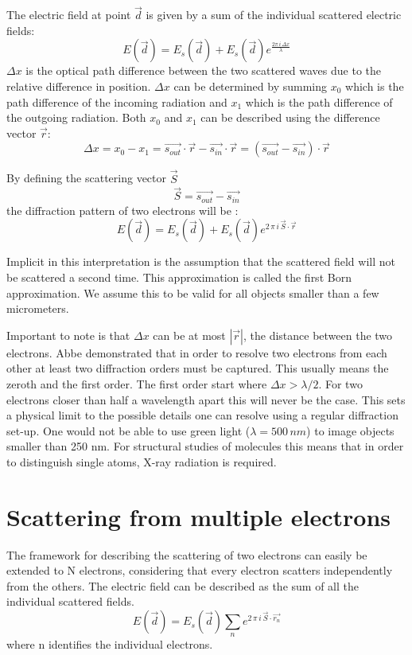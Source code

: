 The electric field at point $\vec{d}$ is given by a sum of the individual scattered electric fields:
\begin{equation}
E(\vec{d}) = E_s(\vec{d})+E_s(\vec{d}) e^{\frac{2 \pi\,i\,\Delta x}{\lambda}} 	 
\end{equation}
$\Delta x$ is the optical path difference between the two scattered waves due to the relative difference in position. $\Delta x$ can be determined by summing $x_0$ which is the path difference of the incoming radiation and $x_1$ which is the path difference of the outgoing radiation. Both $x_0$ and $x_1$ can be described using the difference vector $\vec{r}$: 
\begin{equation}
\Delta x = x_0 - x_1 =\vec{s_{out}} \cdot \vec{r}-\vec{ s_{in}}\cdot \vec{r} = (\vec{s_{out}} -\vec{s_{in}} ) \cdot \vec{r} 
\end{equation}

By defining the scattering vector $\vec{S}$
\begin{equation}\label{eq:ScatteringVector}
\vec{S} = \vec{s_{out}}-\vec{s_{in}}
\end{equation}
the diffraction pattern of two electrons will be :
\begin{equation}
E(\vec{d}) = E_s(\vec{d}) + E_s(\vec{d}) e^{2\,\pi\,  i\,\vec{S}\cdot\vec{r}}
\end{equation}

Implicit in this interpretation is the assumption that the scattered field will not be scattered a second time. This approximation is called the first Born approximation. We assume this to be valid for all objects smaller than a few micrometers.

Important to note is that $\Delta x $ can be at most $|\vec{r}|$, the distance between the two electrons. Abbe demonstrated that in order to resolve two electrons from each other at least two diffraction orders must be captured. This usually means the zeroth and the first order. The first order start where $\Delta x > \lambda/2$. For two electrons closer than half a wavelength apart this will never be the case. This sets a physical limit to the possible details one can resolve using a regular diffraction set-up. One would not be able to use green light ($\lambda = 500\,nm$) to image objects smaller than 250 nm. For structural studies of molecules this means that in order to distinguish single atoms, X-ray radiation is required.

\section{Scattering from multiple electrons}
The framework for describing the scattering of two electrons can easily be extended to N electrons, considering that every electron scatters independently from the others. The electric field can be described as the sum of all the individual scattered fields.
\begin{equation}\label{eq:boehoe}
E(\vec{d}) = E_s(\vec{d}) \sum_{n} e^{2\,\pi\,  i\,\vec{S}\cdot\vec{r_n}}
\end{equation}
where n identifies the individual electrons.

